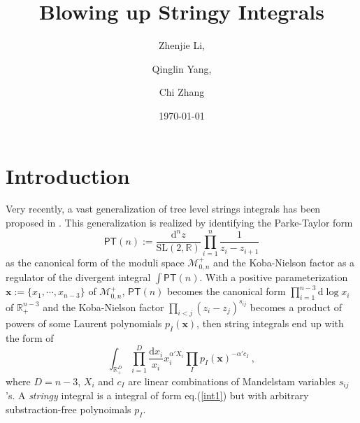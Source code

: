 \documentclass[12pt]{article}
\date{\today}
\title{Blowing up Stringy Integrals}
\author{Zhenjie Li,\and Qinglin Yang,\and Chi Zhang}
\theoremstyle{definition}
\theoremstyle{plain}
\newcommand{\dif}{\mathrm{d}} %
\begin{document}
\maketitle

\section{Introduction}

Very recently, a vast generalization of tree level strings integrals has been proposed in \cite{}. This generalization is realized by identifying the Parke-Taylor form 
\[
	\mathsf{PT}(n):=\frac{\dif^{n}z}{\mathrm{SL}(2,\mathds{R})} \prod_{i=1}^{n}\frac{1}{z_{i}-z_{i+1}}
\]
as the canonical form of the moduli space $\mathcal{M}_{0,n}^{+}$ and the Koba-Nielson factor as a regulator of the divergent integral $\int \mathsf{PT}(n)$. With a positive parameterization  $\mathbf{x}:= \{x_{1},\cdots, x_{n-3}\}$  of $\mathcal{M}_{0,n}^{+}$, $\mathsf{PT}(n)$ becomes the canonical form $\prod_{i=1}^{n-3} \dif \log x_{i}$ of $\mathds{R}_{+}^{n-3}$ and the Koba-Nielson factor $\prod_{i<j} (z_{i}-z_{j})^{s_{ij}}$ becomes a product of powers of some Laurent polynomials $p_{I}(\mathbf{x})$, then string integrals end up with the form of
\begin{equation} 
	\int_{\mathds{R}_{+}^{D}} \prod_{i=1}^{D}\frac{\dif x_{i}}{x_{i}}x_{i}^{\alpha' X_{i}}\prod_{I}p_{I}(\mathbf{x})^{-\alpha'c_{I}}	\:, \label{int1}
\end{equation}
where $D=n{-}3$, $X_{i}$ and $c_{I}$ are linear combinations of Mandelstam variables $s_{ij}$'s. A \emph{stringy} integral is a integral of form eq.(\ref{int1}) but with arbitrary substraction-free polynoimals $p_{I}$. 

\end{document}
